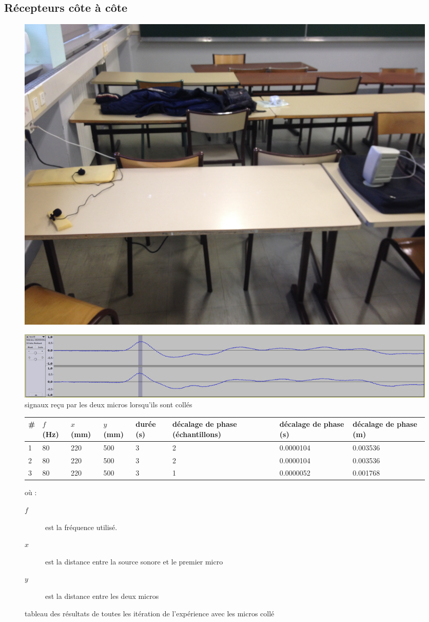 \subsection{Récepteurs côte à côte}
\begin{figure}[H]
\includegraphics[width=\textwidth]{../tests/test_du_protocole/micros_cote_a_cote.jpg} 
\end{figure}

\begin{figure}[H]
\includegraphics[width=\textwidth]{../tests/test_du_protocole/mesures_micro_colles/colles.png} 
\caption{signaux reçu par les deux micros lorsqu'ils sont collés}
\end{figure}

\begin{figure}[H]
\begin{tabular}{|l || p{1.4cm} | p{1.4cm} | p{1.4cm} | p{1.4cm} | p{1.4cm} | p{1.7cm} | p{1.7cm}  |}
\hline
\# & $f$ (Hz) & $x$ (mm) & $y$ (mm) & durée (s) & décalage de phase (échantillons) & décalage de phase (s) & décalage de phase (m)\\
\hline
\hline
1	&80	&220	&500	&3	&2	&0.0000104	&0.003536\\
2	&80	&220	&500	&3	&2	&0.0000104	&0.003536\\
3	&80	&220	&500	&3	&1	&0.0000052	&0.001768\\
\hline
\end{tabular}
où : 
\begin{description}
\item[$f$] est la fréquence utilisé.
\item[$x$] est la distance entre la source sonore et le premier micro
\item[$y$] est la distance entre les deux micros
\end{description}
\caption{tableau des résultats de toutes les itération de l'expérience avec les micros collé}
\end{figure}

